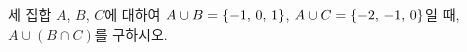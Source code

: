세 집합 $A$, $B$, $C$에 대하여 $A\cup B=\{-1,\mkern3mu 0,\mkern3mu 1\}$, $A\cup C=\{-2,\mkern3mu -1,\mkern3mu 0\}$일 때, $A\cup(B\cap C)$를 구하시오.

